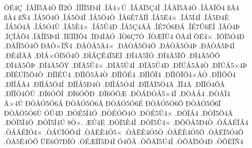 {^^d2^^cb4^^c7
.^^cd^^c5^^cc^^cf5^^c44^^d2
^^cf^^cf2^^d3
.^^cd^^cf^^ce^^cf5^^d04^^cc
.^^ce^^c14^^d7^^da
.^^ce^^c1^^c4^^cf5^^c74^^ce
.^^ce^^c1^^c4^^cf5^^c44^^d2
.^^ce^^c1^^c4^^cf^^d54
^^df^^c54
^^df^^c04
^^df^^d14
.^^ce^^c15^^d64^^d6
.^^ce^^c15^^d64^^ce
.^^ce^^c15^^d64^^d2
.^^ce^^c16^^c97^^c2^^cf^^cc
.^^ce^^c15^^cb4^^d7
.^^ce^^c15^^cd4^^ce
.^^ce^^c15^^d04^^c8
.^^ce^^c15^^d34^^c2
.^^ce^^c15^^d34^^db
.^^ce^^c15^^c84^^d7
.^^ce^^c15^^db4^^d0
.^^ce^^c55^^c74^^c4^^c5
.^^ce^^c97^^d36^^d0^^c1
.^^ce^^c97^^db6^^cb^^ce
.^^cf^^c2^^d34^^de
.^^cf^^c7^^ce^^c5^^d54
.^^cf^^c4^^ce^^cf5^^de4^^cc
.^^cf^^cb^^cf^^cc^^cf^^d54
.^^cf^^d04^^cc^^c5^^d3
.^^cf^^d26^^c77^^d2
.^^cf^^d2^^c6^^cf^^dc4
^^d4^^c24^^cc
^^d4^^cb4^^d7
.^^cf^^d4^^cf5^^d34^^d0
.^^d0^^c5^^ce^^cf5^^d34^^d4
^^d0^^c5^^d2^^d7^^cf^^d14
.^^d0^^c5^^d2^^c55^^c44^^d7
.^^d0^^c5^^d2^^c55^^d64^^d6
.^^d0^^c5^^d2^^c55^^d34^^de
.^^d0^^c5^^d2^^c55^^de4^^cc
.^^d0^^c94^^cf^^c4^^c5
.^^d0^^cc^^c1^^d7^^d3^^cf5^^d34^^d4
.^^d0^^cc^^c1^^c7^^c94^^cf5^^cb^^cc
.^^d0^^cf4^^c45^^cf^^d3
.^^d0^^cf4^^c45^^cf^^d4
.^^d0^^cf4^^c45^^d5^^d4
.^^d0^^cf4^^c45^^d5^^de
.^^d0^^cf4^^c45^^d5^^dd
.^^d0^^cf^^c45^^db4^^d7
.^^d0^^cf^^c45^^db4^^cc
.^^d0^^cf^^c45^^db4^^d0
.^^d0^^cf^^da^^c15^^c24^^d2
.^^d0^^cf^^da^^c15^^d74^^de
.^^d0^^cf^^c9^^da^^cf5^^d44^^d2
.^^d0^^cf^^cc^^c9^^dc4
.^^d0^^cf^^cc^^d55^^c24^^d2
.^^d0^^cf^^cc^^d5^^c94
.^^d0^^cf^^cc^^d5^^cf4
.^^d0^^cf^^cc^^d5^^cf^^d44^^d7^^c5^^d2
.^^d0^^cf^^cc^^d5^^d54
.^^d0^^cf^^ce^^c1^^c54
.^^d0^^cf^^ce^^c15^^d64^^cd
.^^d0^^cf^^ce^^c15^^d04^^d2
.^^d0^^cf^^ce^^c15^^d34^^cc
.^^d0^^cf^^cf^^c2^^cf5^^d64^^c4
.^^cf^^cf4^^c4
.^^d0^^cf^^cf^^d34^^d4^^c5
.^^d0^^cf^^cf^^d34^^d4^^d9
.^^d0^^cf6^^d3^^d4^^ce
.^^d0^^cf6^^d3^^d4^^d0
.^^d0^^cf6^^d3^^d4^^c6
.^^d0^^d2^^c1^^d0^^d2^^c15^^d74^^ce
.^^d0^^d2^^c5^^c14
.^^d0^^d2^^c5^^cf4
^^c4^^d74^^da
^^d0^^d2^^c5^^d35^^d36^^c1
^^d0^^d2^^c5^^d35^^d36^^c5
^^d0^^d2^^c5^^d35^^d36^^c9
^^d0^^d2^^c5^^d35^^d36^^d5
^^d0^^d2^^c5^^d35^^d36^^cf
^^d0^^d2^^c5^^d35^^d36^^d9
^^d3^^db4^^d0
.^^d0^^d2^^c95^^cd4^^d3
.^^d0^^d2^^c9^^d3^^d44^^d2
.^^d0^^d2^^c95^^db4^^d7
.^^d0^^d2^^cf^^c14
.^^d0^^d2^^cf5^^d64^^c4
.^^d0^^d2^^cf5^^ce4^^d6
.^^d0^^d2^^cf5^^ce4^^da
8^^d2^^d7.
^^c6^^db4^^cb
.^^d0^^d2^^cf5^^c84^^ce
.^^d0^^d2^^cf5^^db4^^d7
.^^d0^^d5^^d4^^c55^^d04^^d2
.^^d2^^c1^^c4^^c9^^cf^^c14
.^^d2^^c1^^c4^^c9^^cf^^d34^^d7
.^^d2^^c1^^da^^cf^^d3^^d44^^cc
.^^d2^^c5^^ca^^c84^^d35^^d7
.^^d2^^c5^^ca^^c84^^d35^^d2
.^^d2^^c5^^ca^^c84^^d35^^d4
.^^d2^^c5^^cb^^cf5^^d34^^d4
.^^d2^^c55^^cb4^^d2^^d5
^^dc^^cb6^^d37^^d0^^cf^^d2
.^^d2^^c9^^c6^^cd^^cf5^^d04^^cc
^^d34^^d4^^c2
.^^d2^^d5^^c4^^cf5^^da4^^ce
.^^d2^^d5^^c4^^cf5^^d34^^d0
.^^d2^^d5^^cb^^cf^^d14
}
